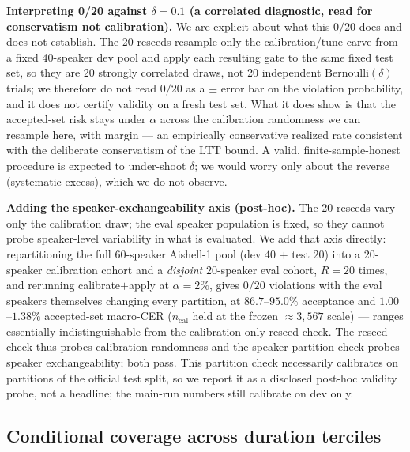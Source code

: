 \documentclass[11pt]{article}
\begin{document}
\textbf{Interpreting 0/20 against $\delta=0.1$ (a correlated diagnostic, read for
conservatism not calibration).} We are explicit about what this $0/20$ does and does not
establish. The 20 reseeds resample only the calibration/tune carve from a fixed
40-speaker dev pool and apply each resulting gate to the same fixed test set, so
they are 20 strongly correlated draws, not 20 independent $\mathrm{Bernoulli}(\delta)$
trials; we therefore do not read $0/20$ as a $\pm$ error bar on the violation
probability, and it does not certify validity on a fresh test set. What it does
show is that the accepted-set risk stays under $\alpha$ across the calibration
randomness we can resample here, with margin --- an empirically conservative realized
rate consistent with the deliberate conservatism of the LTT bound. A valid,
finite-sample-honest procedure is expected to under-shoot $\delta$; we would worry only
about the reverse (systematic excess), which we do not observe.

\textbf{Adding the speaker-exchangeability axis (post-hoc).} The 20 reseeds vary only the
calibration draw; the eval speaker population is fixed, so they cannot probe speaker-level
variability in what is evaluated. We add that axis directly: repartitioning the full
$60$-speaker Aishell-1 pool (dev $40$ $+$ test $20$) into a $20$-speaker calibration cohort
and a \emph{disjoint} $20$-speaker eval cohort, $R=20$ times, and rerunning calibrate$+$apply
at $\alpha=2\%$, gives $0/20$ violations with the eval speakers themselves changing every
partition, at $86.7$--$95.0\%$ acceptance and $1.00$--$1.38\%$ accepted-set macro-CER
($n_{\mathrm{cal}}$ held at the frozen $\approx3{,}567$ scale) --- ranges essentially
indistinguishable from the calibration-only reseed check. The reseed check thus probes
calibration randomness and the speaker-partition check probes speaker exchangeability; both
pass. This partition check necessarily calibrates on partitions of the official test split, so
we report it as a disclosed post-hoc validity probe, not a headline; the main-run numbers
still calibrate on dev only.

\subsection{Conditional coverage across duration terciles}\label{sec:mondrian}
\end{document}
